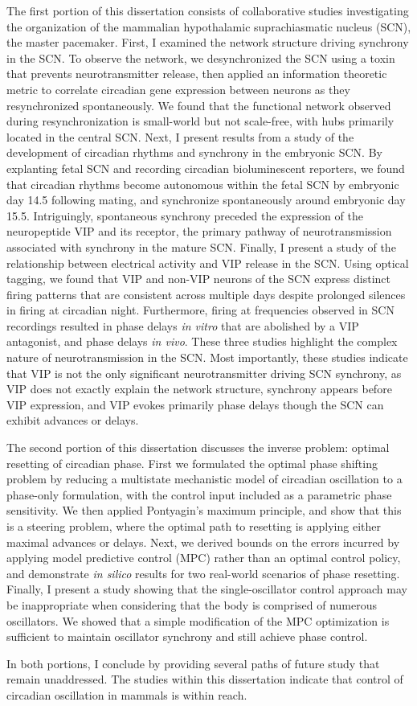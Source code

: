 {The first portion of this dissertation consists of collaborative studies investigating the organization of the mammalian hypothalamic suprachiasmatic nucleus (SCN), the master pacemaker.
First, I examined the network structure driving synchrony in the SCN.
To observe the network, we desynchronized the SCN using a toxin that prevents neurotransmitter release, then applied an information theoretic metric to correlate circadian gene expression between neurons as they resynchronized spontaneously.
We found that the functional network observed during resynchronization is small-world but not scale-free, with hubs primarily located in the central SCN.
Next, I present results from a study of the development of circadian rhythms and synchrony in the embryonic SCN.
By explanting fetal SCN and recording circadian bioluminescent reporters, we found that circadian rhythms become autonomous within the fetal SCN by embryonic day 14.5 following mating, and synchronize spontaneously around embryonic day 15.5.
Intriguingly, spontaneous synchrony preceded the expression of the neuropeptide VIP and its receptor, the primary pathway of neurotransmission associated with synchrony in the mature SCN.
Finally, I present a study of the relationship between electrical activity and VIP release in the SCN.
Using optical tagging, we found that VIP and non-VIP neurons of the SCN express distinct firing patterns that are consistent across multiple days despite prolonged silences in firing at circadian night.
Furthermore, firing at frequencies observed in SCN recordings resulted in phase delays \textit{in vitro} that are abolished by a VIP antagonist, and phase delays \textit{in vivo}.
These three studies highlight the complex nature of neurotransmission in the SCN.
Most importantly, these studies indicate that VIP is not the only significant neurotransmitter driving SCN synchrony, as VIP does not exactly explain the network structure, synchrony appears before VIP expression, and VIP evokes primarily phase delays though the SCN can exhibit advances or delays.

The second portion of this dissertation discusses the inverse problem: optimal resetting of circadian phase.
First we formulated the optimal phase shifting problem by reducing a multistate mechanistic model of circadian oscillation to a phase-only formulation, with the control input included as a parametric phase sensitivity.
We then applied Pontyagin's maximum principle, and show that this is a steering problem, where the optimal path to resetting is applying either maximal advances or delays.
Next, we derived bounds on the errors incurred by applying model predictive control (MPC) rather than an optimal control policy, and demonstrate \textit{in silico} results for two real-world scenarios of phase resetting.
Finally, I present a study showing that the single-oscillator control approach may be inappropriate when considering that the body is comprised of numerous oscillators.
We showed that a simple modification of the MPC optimization is sufficient to maintain oscillator synchrony and still achieve phase control.

In both portions, I conclude by providing several paths of future study that remain unaddressed.
The studies within this dissertation indicate that control of circadian oscillation in mammals is within reach.




}

